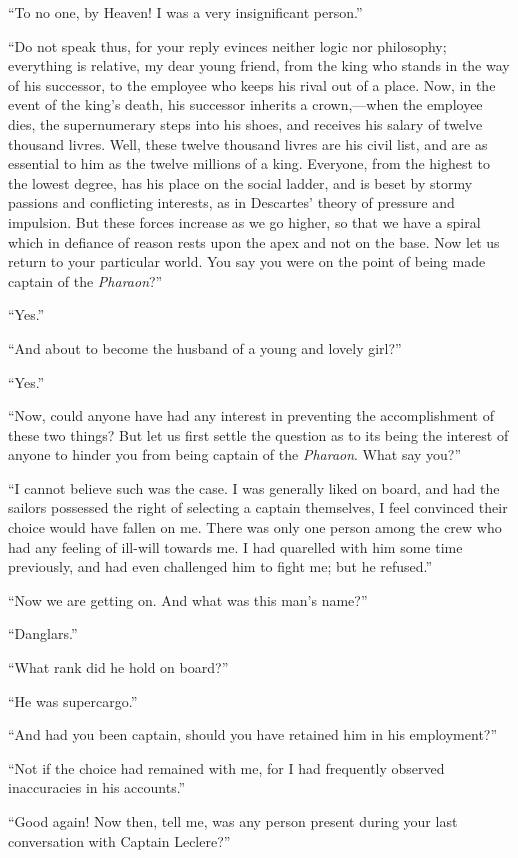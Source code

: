 “To no one, by Heaven! I was a very insignificant person.”

“Do not speak thus, for your reply evinces neither logic nor
philosophy; everything is relative, my dear young friend, from the king
who stands in the way of his successor, to the employee who keeps his
rival out of a place. Now, in the event of the king’s death, his
successor inherits a crown,—when the employee dies, the supernumerary
steps into his shoes, and receives his salary of twelve thousand
livres. Well, these twelve thousand livres are his civil list, and are
as essential to him as the twelve millions of a king. Everyone, from
the highest to the lowest degree, has his place on the social ladder,
and is beset by stormy passions and conflicting interests, as in
Descartes’ theory of pressure and impulsion. But these forces increase
as we go higher, so that we have a spiral which in defiance of reason
rests upon the apex and not on the base. Now let us return to your
particular world. You say you were on the point of being made captain
of the \textit{Pharaon}?”

“Yes.”

“And about to become the husband of a young and lovely girl?”

“Yes.”

“Now, could anyone have had any interest in preventing the
accomplishment of these two things? But let us first settle the
question as to its being the interest of anyone to hinder you from
being captain of the \textit{Pharaon}. What say you?”

“I cannot believe such was the case. I was generally liked on board,
and had the sailors possessed the right of selecting a captain
themselves, I feel convinced their choice would have fallen on me.
There was only one person among the crew who had any feeling of
ill-will towards me. I had quarelled with him some time previously, and
had even challenged him to fight me; but he refused.”

“Now we are getting on. And what was this man’s name?”

“Danglars.”

“What rank did he hold on board?”

“He was supercargo.”

“And had you been captain, should you have retained him in his
employment?”

“Not if the choice had remained with me, for I had frequently observed
inaccuracies in his accounts.”

“Good again! Now then, tell me, was any person present during your last
conversation with Captain Leclere?”


